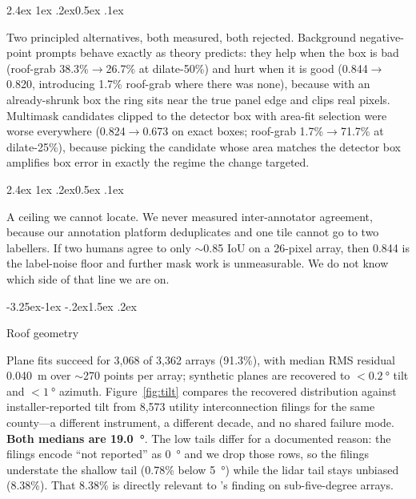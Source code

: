 \documentclass[10pt,twocolumn]{article}
\makeatletter
\renewcommand\subsection{\@startsection{subsection}{2}{\z@}%
  {-3.25ex\@plus -1ex \@minus -.2ex}{1.5ex \@plus .2ex}%
  {\normalfont\large\bfseries\raggedright}}
\renewcommand\paragraph{\@startsection{paragraph}{4}{\z@}%
  {2.4ex \@plus1ex \@minus.2ex}{0.5ex \@plus .1ex}%
  {\normalfont\normalsize\bfseries\raggedright}}
\makeatother
\begin{document}
\paragraph{Two principled alternatives, both measured, both rejected.}
Background negative-point prompts behave exactly as theory predicts: they help when the
box is bad (roof-grab 38.3\%$\rightarrow$26.7\% at dilate-50\%) and hurt when it is good
(0.844$\rightarrow$0.820, introducing 1.7\% roof-grab where there was none), because with
an already-shrunk box the ring sits near the true panel edge and clips real pixels.
Multimask candidates clipped to the detector box with area-fit selection were worse
everywhere (0.824$\rightarrow$0.673 on exact boxes; roof-grab 1.7\%$\rightarrow$71.7\% at
dilate-25\%), because picking the candidate whose area matches the detector box amplifies
box error in exactly the regime the change targeted.

\paragraph{A ceiling we cannot locate.}
We never measured inter-annotator agreement, because our annotation platform deduplicates
and one tile cannot go to two labellers. If two humans agree to only $\sim$0.85 IoU
on a 26-pixel array, then 0.844 is the label-noise floor and further mask work is
unmeasurable. We do not know which side of that line we are on.

\subsection{Roof geometry}
\label{sec:results-geometry}

Plane fits succeed for 3{,}068 of 3{,}362 arrays (91.3\%), with median RMS residual
\SI{0.040}{\metre} over $\sim$270 points per array; synthetic planes are recovered to
$<\SI{0.2}{\degree}$ tilt and $<\SI{1}{\degree}$ azimuth. Figure~\ref{fig:tilt} compares
the recovered distribution against installer-reported tilt from 8{,}573 utility
interconnection filings for the same county---a different instrument, a different decade,
and no shared failure mode. \textbf{Both medians are \SI{19.0}{\degree}}. The low tails
differ for a documented reason: the filings encode ``not reported'' as \SI{0}{\degree} and
we drop those rows, so the filings understate the shallow tail (0.78\% below
\SI{5}{\degree}) while the lidar tail stays unbiased (8.38\%). That 8.38\% is directly
relevant to \citet{mejia2013}'s finding on sub-five-degree arrays.
\end{document}
